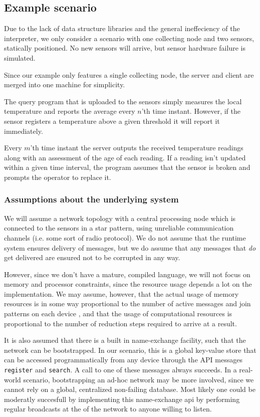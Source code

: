 \subsection*{Example scenario}

Due to the lack of data structure libraries and the general ineffeciency of the
interpreter, we only consider a scenario with one collecting node and two
sensors, statically positioned. No new sensors will arrive, but sensor hardware
failure is simulated.

Since our example only features a single collecting node, the server and client
are merged into one machine for simplicity.

The query program that is uploaded to the sensors simply measures the local
temperature and reports the average every $n$'th time instant.  However, if the
sensor registers a temperature above a given threshold it will report it
immediately.

Every $m$'th time instant the server outputs the received temperature readings
along with an assessment of the age of each reading. If a reading isn't updated
within a given time interval, the program assumes that the sensor is broken and
prompts the operator to replace it.

\subsubsection*{Assumptions about the underlying system}

We will assume a network topology with a central processing node
which is connected to the sensors in a star pattern, using
unreliable communication channels (i.e. some sort of radio protocol).
We do not assume that the runtime system ensures delivery of messages,
but we do assume that any messages that \emph{do} get delivered are
ensured not to be corrupted in any way.

However, since we don't have a mature, compiled language, we will not focus on
memory and processor constraints, since the resource usage depends a lot on the
implementation. We may assume, however, that the actual usage of memory
resources is in some way proportional to the number of active messages and join
patterns on each device , and that the usage of computational resources is
proportional to the number of reduction steps required to arrive at a result.

It is also assumed that there is a built in name-exchange facility,
such that the network can be bootstrapped. In our scenario, this is a
global key-value store that can be accessed programmatically from any
device through the API messages \verb!register! and \verb!search!. A
call to one of these messages always succeeds. In a real-world
scenario, bootstrapping an ad-hoc network may be more involved, since
we cannot rely on a global, centralized non-failing database. Most likely one
could be moderatly succesfull by implementing this name-exchange api by
performing regular broadcasts at the 
of the network to anyone willing to listen.

